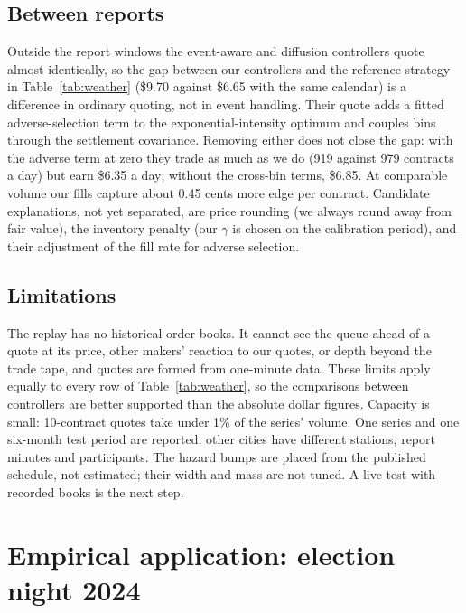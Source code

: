 \documentclass[11pt]{article}
\newcommand{\1}{\mathbf 1}
\begin{document}
\subsection{Between reports}
Outside the report windows the event-aware and diffusion controllers quote
almost identically, so the gap between our controllers and the reference strategy
in Table~\ref{tab:weather} (\$9.70 against \$6.65 with the same calendar) is a
difference in ordinary quoting, not in event handling. Their quote adds a
fitted adverse-selection term to the exponential-intensity optimum and couples
bins through the settlement covariance. Removing either does not close the gap:
with the adverse term at zero they trade as much as we do (919 against 979
contracts a day) but earn \$6.35 a day; without the cross-bin terms, \$6.85.
At comparable volume our fills capture about 0.45 cents more edge per contract.
Candidate explanations, not yet separated, are price rounding (we always round
away from fair value), the inventory penalty (our $\gamma$ is chosen on the
calibration period), and their adjustment of the fill rate for adverse selection.

\subsection{Limitations}
The replay has no historical order books. It cannot see the queue ahead of a
quote at its price, other makers' reaction to our quotes, or depth beyond the
trade tape, and quotes are formed from one-minute data. These limits apply equally
to every row of Table~\ref{tab:weather}, so the comparisons between controllers
are better supported than the absolute dollar figures. Capacity is small: 10-contract
quotes take under 1\% of the series' volume. One series and one six-month test
period are reported; other cities have different stations, report minutes and
participants. The hazard bumps are placed from the published schedule, not
estimated; their width and mass are not tuned. A live test with recorded books
is the next step.

\clearpage
\section{Empirical application: election night 2024}
\label{sec:election}
\end{document}
